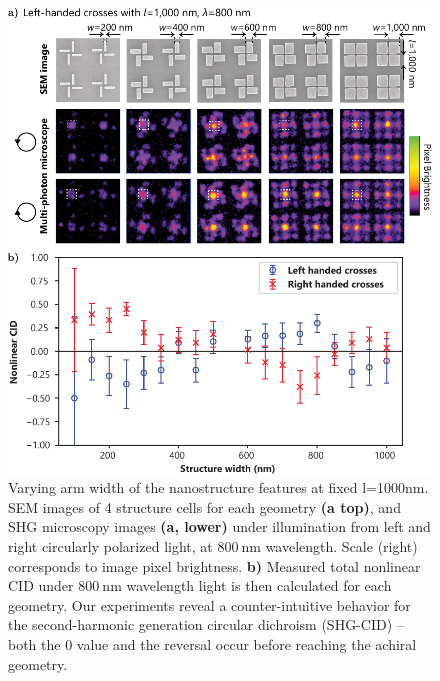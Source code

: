 \begin{figure}[htb!]	
    \centering	
    \includegraphics[scale=1]{./figures/results/EnantiomorphingChiralCrosses/l1000data.pdf}
    \caption{\label{fig:results:EnantiomorphingChiralCrosses:l1000data}
    Varying arm width of the nanostructure features at fixed l=1000nm. SEM images of 4 structure cells for each geometry \textbf{(a top)}, and SHG microscopy images \textbf{(a, lower)} under illumination from left and right circularly polarized light, at $\SI{800}{\nano\m}$ wavelength. Scale (right) corresponds to image pixel brightness. \textbf{b)} Measured total nonlinear CID under $\SI{800}{\nano\m}$ wavelength light is then calculated for each geometry. Our experiments reveal a counter-intuitive behavior for the second-harmonic generation circular dichroism (SHG-CID) – both the 0 value and the reversal occur before reaching the achiral geometry.}	
\end{figure}


